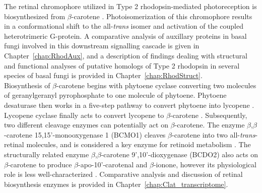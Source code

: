 \indent The retinal chromophore utilized in Type 2 rhodopsin-mediated photoreception is biosynthesized from $\beta$-carotene \cite{VonLintig2000}. Photoisomerization of this chromophore results in a conformational shift to the all-\textit{trans} isomer \cite{Smith2010} and activation of the coupled heterotrimeric G-protein. A comparative analysis of auxillary proteins in basal fungi involved in this downstream signalling cascade is given in Chapter~\ref{chap:RhodAux}, and a description of findings dealing with structural and functional analyses of putative homologs of Type 2 rhodopsin in several species of basal fungi is provided in Chapter~\ref{chap:RhodStruct}.\\
\indent Biosynthesis of $\beta$-carotene begins with phytoene cyclase converting two molecules of geranylgeranyl pyrophosphate to one molecule of phytoene. Phytoene desaturase then works in a five-step pathway to convert phytoene into lycopene \cite{Hausmann2000}. Lycopene cyclase finally acts to convert lycopene to $\beta$-carotene \cite{Cunningham1994}. Subsequently, two different cleavage enzymes can potentially act on $\beta$-carotene. The enzyme $\beta$,$\beta$-carotene 15,15'-monooxygenase 1 (BCMO1) cleaves $\beta$-carotene into two all-\textit{trans}-retinal molecules, and is considered a key enzyme for retinoid metabolism \cite{Lietz2012}. The structurally related enzyme $\beta$,$\beta$-carotene 9',10'-dioxygenase (BCDO2) also acts on $\beta$-carotene to produce $\beta$-apo-10'-carotenal and $\beta$-ionone, however its physiological role is less well-characterized \cite{Lobo2012}. Comparative analysis and discussion of retinal biosynthesis enzymes is provided in Chapter~\ref{chap:Clat_transcriptome}.\\
